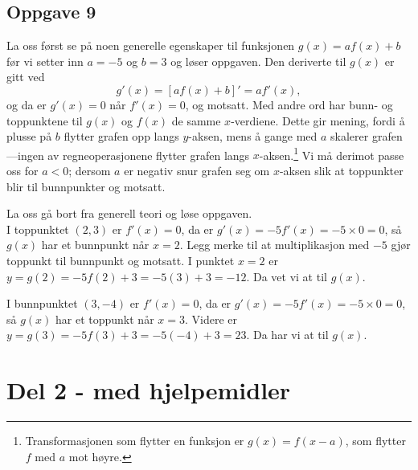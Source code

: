 \subsection*{Oppgave 9}
La oss først se på noen generelle egenskaper til funksjonen $g(x) = a f(x) + b$ før vi setter inn $a=-5$ og $b=3$ og løser oppgaven.
Den deriverte til $g(x)$ er gitt ved
\begin{equation*}
	g'(x) = \left[ a f(x) + b \right]' = a f'(x),
\end{equation*}
og da er $g'(x) = 0$ når $f'(x) = 0$, og motsatt.
Med andre ord har bunn- og toppunktene til $g(x)$ og $f(x)$ de samme $x$-verdiene. Dette gir mening, fordi å plusse på $b$ flytter grafen opp langs $y$-aksen, mens å gange med $a$ skalerer grafen---ingen av regneoperasjonene flytter grafen langs $x$-aksen.\footnote{Transformasjonen som flytter en funksjon er $g(x) = f(x - a)$, som flytter $f$ med $a$ mot høyre.}
Vi må derimot passe oss for $a < 0$; dersom $a$ er negativ snur grafen seg om $x$-aksen slik at toppunkter blir til bunnpunkter og motsatt.

La oss gå bort fra generell teori og løse oppgaven. \\
I toppunktet $(2, 3)$ er $f'(x) = 0$, da er $g'(x) = -5 f'(x) = -5 \times 0 = 0$, så $g(x)$ har et bunnpunkt når $x = 2$. 
Legg merke til at multiplikasjon med $-5$ gjør toppunkt til bunnpunkt og motsatt. 
I punktet $x=2$ er $y = g(2) = -5 f(2) + 3 = -5 (3) +3 = -12$. 
Da vet vi at  til $g(x)$.

I bunnpunktet $(3, -4)$ er $f'(x) = 0$, da er $g'(x) = -5 f'(x) = -5 \times 0 = 0$, så $g(x)$ har et toppunkt når $x = 3$. 
Videre er $y = g(3) = -5 f(3) + 3 = -5 (-4) + 3 = 23$. 
Da har vi at  til $g(x)$.









\section*{Del 2 - med hjelpemidler}

